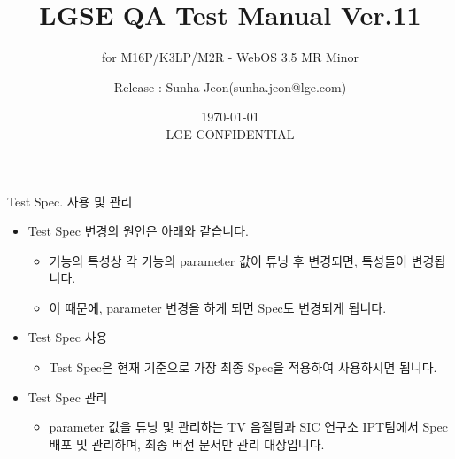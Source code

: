 \documentclass{beamer}
\title[WebOS 3.5 MR Minor QA spec \alert{LGE CONFIDENTIAL}] %
{LGSE QA Test Manual Ver.11}
\subtitle
{for M16P/K3LP/M2R - WebOS 3.5 MR Minor} %
\author[editor-Kichul Kim, Sunha Jeon] %
{Release : Sunha Jeon(sunha.jeon@lge.com)}
\institute[IPT team, SIC lab., LG Electronics] %
{
  IPT team, SIC lab., LG Electronics \\
  Release Link: (http://collab.lge.com/main/display/LGSE/LGSE+QA+Test+Manual)
  }
\date[Short Occasion] %
{\today\\ \alert{LGE CONFIDENTIAL}}
\begin{document}
\begin{frame}
  \titlepage
\end{frame}


\begin{frame}[t]{Test Spec. 사용 및 관리}

 \begin{itemize}
 \item Test Spec 변경의 원인은 아래와 같습니다.
 	\begin{itemize}
	\item 기능의 특성상 각 기능의 parameter 값이 튜닝 후 변경되면, 특성들이 변경됩니다.
	\item 이 때문에, parameter 변경을 하게 되면 Spec도 변경되게 됩니다.
	\end{itemize}
\end{itemize}

 \begin{itemize}
 \item Test Spec 사용
 	\begin{itemize}
 	\item Test Spec은 현재 기준으로 가장 최종 Spec을 적용하여 사용하시면 됩니다.
	\end{itemize}
\end{itemize}

 \begin{itemize}
 \item Test Spec 관리
 	\begin{itemize}
 	\item parameter 값을 튜닝 및 관리하는 TV 음질팀과 SIC 연구소 IPT팀에서 Spec 배포 및 관리하며, 최종 버전 문서만 관리 대상입니다.
	\end{itemize}
\end{itemize}

\end{frame}
\end{document}
